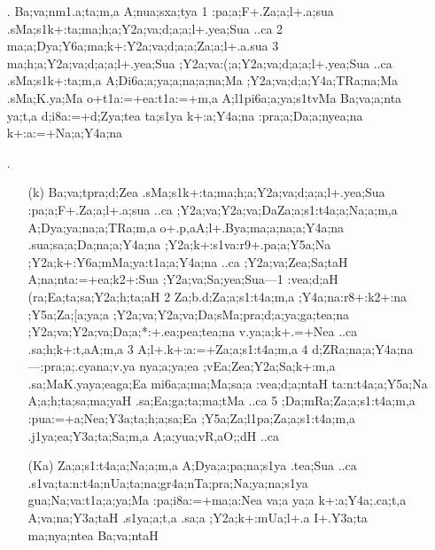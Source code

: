 \begin{spacing}{1.15}
\begin{itemize}
 \item[{\sktf 16}.] {\sktf Ba;va;nm1.a;ta;m,a A;nua;sxa;tya\ZF{,}
\ZF{(}1\ZF{)} :pa;a;F+.Za;a;l+.a;sua .sMa;s1k+:ta;ma;h;a;Y2a;va;d;a;a;l+.yea;Sua ..ca\ZF{,}
\ZF{(}2\ZF{)} ma;a;Dya;Y6a;ma;k+:Y2a;va;d;a;a;Za;a;l+.a.sua\ZF{,} \ZF{(}3\ZF{)} ma;h;a;Y2a;va;d;a;a;l+.yea;Sua
;Y2a;va:(;a;Y2a;va;d;a;a;l+.yea;Sua ..ca
.sMa;s1k+:ta;m,a A;Di6a;a;ya;a;na;a;na;Ma
;Y2a;va;d;a;Y4a;TRa;na;Ma .sMa;K.ya;Ma o+t1a:=+ea:t1a:=+m,a
A;l1pi6a;a;ya;s1tvMa Ba;va;a;nta ya;t,a d;i8a:=+d;Zya;tea\ZF{,}
ta;s1ya k+:a;Y4a;na :pra;a;Da;a;nyea;na k+:a:=+Na;a;Y4a;na}
 
 \item[{\sktf 17}.]
     \begin{itemize}
 \item[({\sktf k})]{\sktf Ba;va;tpra;d;Zea
.sMa;s1k+:ta;ma;h;a;Y2a;va;d;a;a;l+.yea;Sua
:pa;a;F+.Za;a;l+.a;sua ..ca ;Y2a;va;Y2a;va;Da\ZF{-}Za;a;s1:t4a;a;Na;a;m,a
A;Dya;ya;na;a;TRa;m,a o+.p,aA;l+.Bya;ma;a;na;a;Y4a;na .sua;sa;a;Da;na;a;Y4a;na
;Y2a;k+:s1va:r9+.pa;a;Y5a;Na ;Y2a;k+:Y6a;mMa;ya:t1a;a;Y4a;na
..ca\ZF{,} ;Y2a;va;Zea;Sa;taH A;na;nta:=+ea;k2+:Sua
;Y2a;va;Sa;yea;Sua}{\rm---}{\sktf \ZF{(}1\ZF{)} :vea;d;aH \ZF{(}(ra;Ea;ta;sa;Y2a;h;ta;aH\ZF{),} \ZF{(}2\ZF{)}
Za;b.d;Za;a;s1:t4a;m,a \ZF{(};Y4a;na:r8+:k2+:na\ZF{,}
;Y5a;Za;[a;ya;a\ZF{,} ;Y2a;va;Y2a;va;Da;sMa;pra;d;a;ya;ga;tea;na
;Y2a;va;Y2a;va;Da;a;*:+.ea;pea;tea;na v.ya;a;k+.=+Nea ..ca
.sa;h;k+:t,aA;m,a\ZF{),} \ZF{(}3\ZF{)} A;l+.k+:a:=+Za;a;s1:t4a;m,a\ZF{,}
\ZF{(}4\ZF{)} d;ZRa;na;a;Y4a;na}{\rm---}{\sktf :pra;a;.cya\ZF{-}na;v.ya%
\ZF{-}nya;a;ya;ea\ZF{,} ;vEa;Zea;Y2a;Sa;k+:m,a\ZF{,}
{.sa;Ma}{K.ya}{ya;ea}{ga;Ea}\ZF{,} mi6a;a;ma;Ma;sa;a\ZF{,} :vea;d;a;ntaH ta:n:t4a;a;Y5a;Na\ZF{,}
A;a;h;ta;sa;ma;yaH .sa;Ea;ga;ta;ma;tMa ..ca\ZF{,}
\ZF{(}5\ZF{)} ;Da;mRa;Za;a;s1:t4a;m,a\ZF{,} :pua:=+a;Nea;Y3a;ta;h;a;sa;Ea%
\ZF{,} ;Y5a;Za;l1pa;Za;a;s1:t4a;m,a\ZF{,} .j1ya;ea;Y3a;ta;Sa;m,a\ZF{,}
A;a;yua;vR,aO;;dH ..ca} 
 
   \item[({\sktf Ka})] {\sktf Za;a;s1:t4a;a;Na;a;m,a A;Dya;a;pa;na;s1ya\ZF{,}
.tea;Sua ..ca .s1va;ta:n:t4a;nUa;ta;na;gr4a;nTa;pra;Na;ya;na;s1ya\ZF{,}
gua;Na;va:t1a;a;ya;Ma :pa;i8a:=+ma;a:Nea va;a ya;a k+:a;Y4a;.ca;t,a A;va;na;Y3a;taH .s1ya;a;t,a\ZF{,} .sa;a
;Y2a;k+:mUa;l+.a I+.Y3a;ta ma;nya;ntea Ba;va;ntaH }
 

\end{itemize}
\end{itemize}
\end{spacing}
